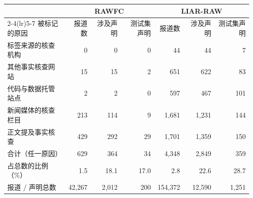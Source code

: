 \begin{tabular}{lrrrrrr}
\toprule
 & \multicolumn{3}{c}{RAWFC} & \multicolumn{3}{c}{LIAR-RAW} \\
\cmidrule(lr){2-4}\cmidrule(lr){5-7}
被标记的原因 & 报道数 & 涉及声明 & 测试集声明 & 报道数 & 涉及声明 & 测试集声明 \\
\midrule
标签来源的核查机构 & 0 & 0 & 0 & 44 & 44 & 7 \\
其他事实核查网站 & 15 & 15 & 2 & 651 & 622 & 83 \\
代码与数据托管站点 & 2 & 2 & 0 & 597 & 467 & 101 \\
新闻媒体的核查栏目 & 213 & 114 & 9 & 1,681 & 1,231 & 144 \\
正文提及事实核查 & 429 & 292 & 29 & 1,701 & 1,359 & 150 \\
\midrule
合计（任一原因） & 629 & 364 & 34 & 4,348 & 2,849 & 359 \\
占总数的比例（\%） & 1.5 & 18.1 & 17.0 & 2.8 & 22.6 & 28.7 \\
报道 / 声明总数 & 42,267 & 2,012 & 200 & 154,372 & 12,590 & 1,251 \\
\bottomrule
\end{tabular}
